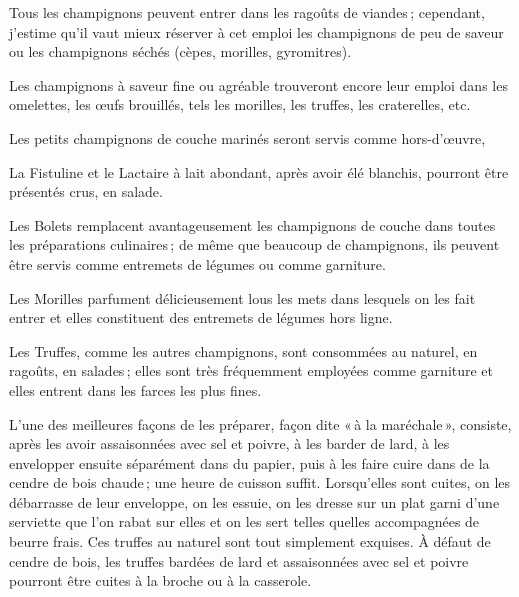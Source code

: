 \medskip

Tous les champignons peuvent entrer dans les ragoûts de viandes ; cependant,
j'estime qu'il vaut mieux réserver à cet emploi les champignons de peu de
saveur ou les champignons séchés (cèpes, morilles, gyromitres).

\medskip

Les champignons à saveur fine ou agréable trouveront encore leur emploi dans
les omelettes, les œufs brouillés, tels les morilles, les truffes, les
craterelles, etc.

\medskip

Les petits champignons de couche marinés seront servis comme hors-d'œuvre,

\medskip

La Fistuline et le Lactaire à lait abondant, après avoir élé blanchis, pourront
être présentés crus, en salade.

\medskip

Les Bolets remplacent avantageusement les champignons de couche dans toutes
les préparations culinaires ; de même que beaucoup de champignons, ils peuvent
être servis comme entremets de légumes ou comme garniture.

\medskip

Les Morilles parfument délicieusement lous les mets dans lesquels on les fait
entrer et elles constituent des entremets de légumes hors ligne.

\medskip

Les Truffes, comme les autres champignons, sont consommées au naturel, en
ragoûts, en salades ; elles sont très fréquemment employées comme garniture et
elles entrent dans les farces les plus fines.

L'une des meilleures façons de les préparer, façon dite « à la maréchale »,
consiste, après les avoir assaisonnées avec sel et poivre, à les barder de
lard, à les envelopper ensuite séparément dans du papier, puis à les faire
cuire dans de la cendre de bois chaude ; une heure de cuisson suffit.
Lorsqu'elles sont cuites, on les débarrasse de leur enveloppe, on les essuie,
on les dresse sur un plat garni d'une serviette que l’on rabat sur elles et on
les sert telles quelles accompagnées de beurre frais. Ces truffes au naturel
sont tout simplement exquises. À défaut de cendre de bois, les truffes bardées
de lard et assaisonnées avec sel et poivre pourront être cuites à la broche ou
à la casserole.

